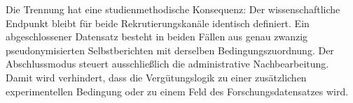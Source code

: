\begin{neu}
Die Trennung hat eine studienmethodische Konsequenz: Der wissenschaftliche Endpunkt bleibt für beide Rekrutierungskanäle identisch definiert. Ein abgeschlossener Datensatz besteht in beiden Fällen aus genau zwanzig pseudonymisierten Selbstberichten mit derselben Bedingungszuordnung. Der Abschlussmodus steuert ausschließlich die administrative Nachbearbeitung. Damit wird verhindert, dass die Vergütungslogik zu einer zusätzlichen experimentellen Bedingung oder zu einem Feld des Forschungsdatensatzes wird.
\end{neu}
